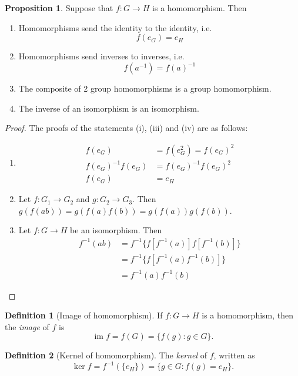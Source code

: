 \documentclass[a4paper]{article}
\theoremstyle{definition}
\newtheorem*{prop}{Proposition}
\newtheorem*{defi}{Definition}
\DeclareMathOperator\im{im}
\begin{document}
\begin{prop}
  Suppose that $f: G\rightarrow H$ is a homomorphism. Then
  \begin{enumerate}
  \item Homomorphisms send the identity to the identity, i.e.
    \[
    f(e_G) = e_H
    \]
  \item Homomorphisms send inverses to inverses, i.e.
    \[
    f(a^{-1}) = f(a)^{-1}
    \]
  \item The composite of 2 group homomorphisms is a group homomorphism.
  \item The inverse of an isomorphism is an isomorphism.
  \end{enumerate}
\end{prop}
\begin{proof}
  The proofs of the statements (i), (iii) and (iv) are as follows:
  \begin{enumerate}
    \item \begin{align*}
      f(e_G) &= f(e_G^2) = f(e_G)^2\\
      f(e_G)^{-1}f(e_G) &= f(e_G)^{-1}f(e_G)^2\\
      f(e_G) &= e_H
    \end{align*}
    \setcounter{enumi}{2}
    \item Let $f:G_1 \rightarrow G_2$ and $g:G_2 \rightarrow G_3$. Then $g(f(ab)) = g(f(a)f(b)) = g(f(a))g(f(b))$.
    \item Let $f:G \rightarrow H$ be an isomorphism. Then
      \begin{align*}
        f^{-1}(ab) &= f^{-1}\{f[f^{-1}(a)]f[f^{-1}(b)]\}\\
        &= f^{-1}\{f[f^{-1}(a)f^{-1}(b)]\}\\
        &= f^{-1}(a)f^{-1}(b)
      \end{align*}
  \end{enumerate}
\end{proof}

\begin{defi}[Image of homomorphism]
  If $f:G\rightarrow H$ is a homomorphism, then the \emph{image} of $f$ is
  \[
  \im f = f(G) = \{f(g):g\in G\}.
  \]
\end{defi}

\begin{defi}[Kernel of homomorphism]
  The \emph{kernel} of $f$, written as
  \[
  \ker f = f^{-1}(\{e_H\}) = \{g\in G:f(g)=e_H\}.
  \]
\end{defi}
\end{document}
